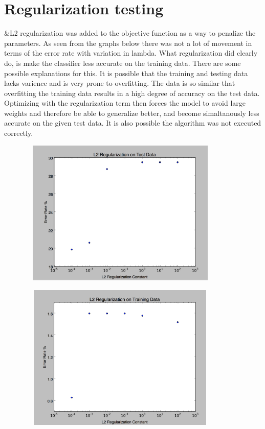 \documentclass[letterpaper,10pt,titlepage]{article}
\begin{document}
\section{Regularization testing}

    &L2 regularization was added to the objective function as a way to penalize the parameters. As seen from the graphs below there was not a lot of movement in terms
    of the error rate with variation in lambda. What regularization did clearly do, is make the classifier less accurate on the training data. There are some possible explanations for this. 
    It is possible that the training and testing data lacks varience and is very prone to overfitting. The data is so similar that overfitting the training data results in a high
    degree of accuracy on the test data. Optimizing with the regularization term then forces the model to avoid large weights and therefore be able to generalize better, 
    and become simaltanously less accurate on the given test data. It is also possible the algorithm was not executed correctly. 
    
    \includegraphics[width=12cm, height=7cm]{L2_test}

    \includegraphics[width=12cm, height=7cm]{L2_train}
\end{document}
